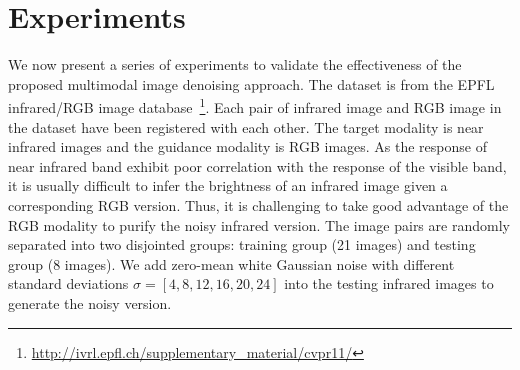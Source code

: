 \documentclass{article}
\begin{document}

\section{Experiments}
\label{sec:Experiments}

\vspace{-0.2cm}

We now present a series of experiments to validate the effectiveness of the proposed multimodal image denoising approach. The dataset is from the EPFL infrared/RGB image database~\cite{brown2011multi}\footnote{\url{http://ivrl.epfl.ch/supplementary_material/cvpr11/}}. Each pair of infrared image and RGB image in the dataset have been registered with each other. The target modality is near infrared images and the guidance modality is RGB images. As the response of near infrared band exhibit poor correlation with the response of the visible band, it is usually difficult to infer the brightness of an infrared image given a corresponding RGB version. Thus, it is challenging to take good advantage of the RGB modality to purify the noisy infrared version.
%
%
%
The image pairs are randomly separated into two disjointed groups: training group (21 images) and testing group (8 images). We add zero-mean white Gaussian noise with different standard deviations $\sigma = [4,8,12,16,20,24]$ into the testing infrared images to generate the noisy version.
\end{document}
